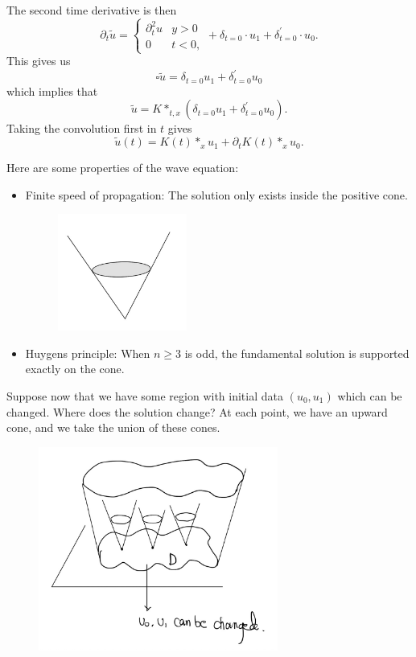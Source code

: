 The second time derivative is then
$$
\partial_{t} \widetilde{u}=\left\{\begin{array}{ll}
\partial_{t}^{2} u & y>0 \\
0 & t<0,
\end{array}+\delta_{t=0} \cdot u_{1}+\delta_{t=0}^{\prime} \cdot u_{0} .\right.
$$
This gives us
$$
\square \widetilde{u}=\delta_{t=0} u_{1}+\delta_{t=0}^{\prime} u_{0}
$$
which implies that
$$
\widetilde{u}=K *_{t, x}\left(\delta_{t=0} u_{1}+\delta_{t=0}^{\prime} u_{0}\right) .
$$
Taking the convolution first in $t$ gives
$$
\widetilde{u}(t)=K(t) *_{x} u_{1}+\partial_{t} K(t) *_{x} u_{0} .
$$

Here are some properties of the wave equation:
\begin{itemize}
    \item Finite speed of propagation: The solution only exists inside the positive cone. 
    \begin{figure}[H]
        \centering
        \includegraphics[width=0.4\textwidth]{pics/25-1.jpeg}
    \end{figure}
    \item Huygens principle: When $n\ge 3$ is odd, the fundamental solution is supported exactly on the cone.
\end{itemize}

Suppose now that we have some region with initial data $(u_0, u_1)$ which can be changed. Where does the solution change? At each point, we have an upward cone, and we take the union of these cones. 

\begin{figure}[H]
    \centering
    \includegraphics[width=0.7\textwidth]{Pics/25-2.png}
\end{figure}

